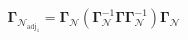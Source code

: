 \begin{equation}
    \boldsymbol{\Gamma}_{\mathcal{N}_{\mathrm{adj}_{1}}}
    =
    \boldsymbol{\Gamma}_{\mathcal{N}}
    \left(
    \boldsymbol{\Gamma}_{\mathcal{N}}^{-1}
    \boldsymbol{\Gamma}
    \boldsymbol{\Gamma}_{\mathcal{N}}^{-1}
    \right)
    \boldsymbol{\Gamma}_{\mathcal{N}}
    \label{eq:gammaMatrix-gammacap-mvn-adj}
\end{equation}
